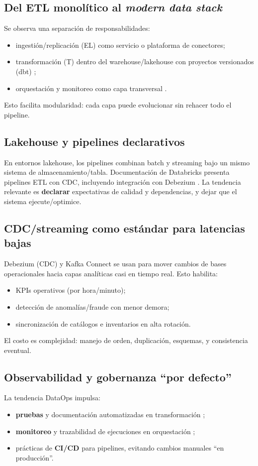 \documentclass[12pt]{article}
\begin{document}
\subsection{Del ETL monolítico al \textit{modern data stack}}
Se observa una separación de responsabilidades:
\begin{itemize}[leftmargin=*]
  \item ingestión/replicación (EL) como servicio o plataforma de conectores;
  \item transformación (T) dentro del warehouse/lakehouse con proyectos versionados (dbt) \cite{dbt_intro};
  \item orquestación y monitoreo como capa transversal \cite{airflow_what_is}.
\end{itemize}
Esto facilita modularidad: cada capa puede evolucionar sin rehacer todo el pipeline.

\subsection{Lakehouse y pipelines declarativos}
En entornos lakehouse, los pipelines combinan batch y streaming bajo un mismo sistema de almacenamiento/tabla. Documentación de Databricks presenta pipelines ETL con CDC, incluyendo integración con Debezium \cite{databricks_cdc_tutorial}. La tendencia relevante es \textbf{declarar} expectativas de calidad y dependencias, y dejar que el sistema ejecute/optimice.

\subsection{CDC/streaming como estándar para latencias bajas}
Debezium (CDC) \cite{debezium_home} y Kafka Connect \cite{kafka_connect_user_guide} se usan para mover cambios de bases operacionales hacia capas analíticas casi en tiempo real. Esto habilita:
\begin{itemize}[leftmargin=*]
  \item KPIs operativos (por hora/minuto);
  \item detección de anomalías/fraude con menor demora;
  \item sincronización de catálogos e inventarios en alta rotación.
\end{itemize}
El costo es complejidad: manejo de orden, duplicación, esquemas, y consistencia eventual.

\subsection{Observabilidad y gobernanza “por defecto”}
La tendencia DataOps impulsa:
\begin{itemize}[leftmargin=*]
  \item \textbf{pruebas} y documentación automatizadas en transformación \cite{dbt_docs_build};
  \item \textbf{monitoreo} y trazabilidad de ejecuciones en orquestación \cite{airflow_what_is};
  \item prácticas de \textbf{CI/CD} para pipelines, evitando cambios manuales “en producción”.
\end{itemize}
\end{document}
